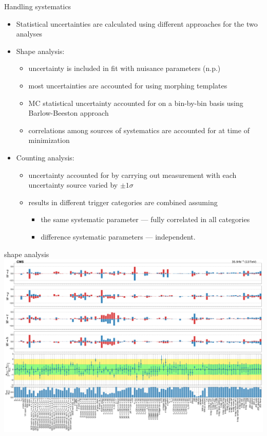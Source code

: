 \begin{frame}{Handling systematics}

    \begin{itemize}
        \item Statistical uncertainties are calculated using different approaches for the two analyses
        \item Shape analysis:
        \begin{itemize}
            \smaller
            \item uncertainty is included in fit with nuisance parameters (n.p.)
            \item most uncertainties are accounted for using morphing templates
            \item MC statistical uncertainty accounted for on a bin-by-bin basis using Barlow-Beeston approach
            \item correlations among sources of systematics are accounted for at time of minimization
        \end{itemize}
        \item Counting analysis:
        \begin{itemize}
            \smaller
            \item uncertainty accounted for by carrying out measurement with each uncertainty source varied by $\pm 1\sigma$
            \item results in different trigger categories are combined assuming
            \begin{itemize}
            \smaller 
                \item the same systematic parameter --- fully correlated in all categories
                \item difference systematic parameters --- independent.
            \end{itemize}
        \end{itemize}
    \end{itemize}

\end{frame}


\begin{frame}{}
shape analysis
    \centering
    \includegraphics[width=\textwidth]{chapters/Analysis/sectionSystematics/figures/pulls_impacts_final.pdf}
\end{frame}



